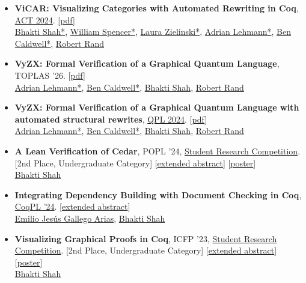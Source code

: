 \documentclass[10pt]{res} %
\begin{document}
\begin{resume}
\begin{itemize}
\item \textbf{ViCAR: Visualizing Categories with Automated Rewriting in Coq}, \href{https://oxford24.github.io/}{ACT 2024}. \href{https://arxiv.org/abs/2404.08163}{[pdf]}\\
\underline{Bhakti Shah*}, \href{.}{William Spencer*}, \href{.}{Laura Zielinski*}, \href{https://adrianlehmann.net/}{Adrian Lehmann*}, \href{https://people.cs.uchicago.edu/~caldwellb/}{Ben Caldwell*}, \href{https://rand.cs.uchicago.edu/}{Robert Rand}

\item \textbf{VyZX: Formal Verification of a Graphical Quantum Language}, TOPLAS '26. [\href{http://arxiv.org/abs/2311.11571}{pdf}]\\
\href{https://adrianlehmann.net/}{Adrian Lehmann*}, \href{https://people.cs.uchicago.edu/~caldwellb/}{Ben Caldwell*}, \underline{Bhakti Shah}, \href{https://rand.cs.uchicago.edu/}{Robert Rand}

\item \textbf{VyZX: Formal Verification of a Graphical Quantum Language with automated structural rewrites}, \href{https://qpl2024.dc.uba.ar/}{QPL 2024}. [\href{https://bhaktishh.github.io/papers/qpl-24-vyzx.pdf}{pdf}]\\
\href{https://adrianlehmann.net/}{Adrian Lehmann*}, \href{https://people.cs.uchicago.edu/~caldwellb/}{Ben Caldwell*}, \underline{Bhakti Shah}, \href{https://rand.cs.uchicago.edu/}{Robert Rand}

\item \textbf{A Lean Verification of Cedar}, POPL '24, \href{https://popl24.sigplan.org/track/POPL-2024-student-research-competition}{Student Research Competition}. [2nd Place, Undergraduate Category] 
[\href{https://bhaktishh.github.io/papers/popl-24-src-abs.pdf}{extended abstract}] [\href{https://bhaktishh.github.io/papers/popl-24-src-poster.pdf}{poster}]\\
\underline{Bhakti Shah} 

\item \textbf{Integrating Dependency Building with Document Checking in Coq}, \href{https://popl24.sigplan.org/home/CoqPL-2024}{CoqPL '24}. [\href{https://bhaktishh.github.io/papers/coqpl-24.pdf}{extended abstract}] \\
\href{https://www.irif.fr/~gallego/}{Emilio Jesús Gallego Arias}, \underline{Bhakti Shah}

\item \textbf{Visualizing Graphical Proofs in Coq}, ICFP '23, \href{https://icfp23.sigplan.org/track/icfp-2023-student-research-competition#About}{Student Research Competition}. [2nd Place, Undergraduate Category] [\href{https://bhaktishh.github.io/papers/icfp-src-23-abs.pdf}{extended abstract}]
[\href{https://bhaktishh.github.io/papers/icfp-23-src-poster.pdf}{poster}] \\
\underline{Bhakti Shah}


\end{itemize}
\end{resume}
\end{document}
